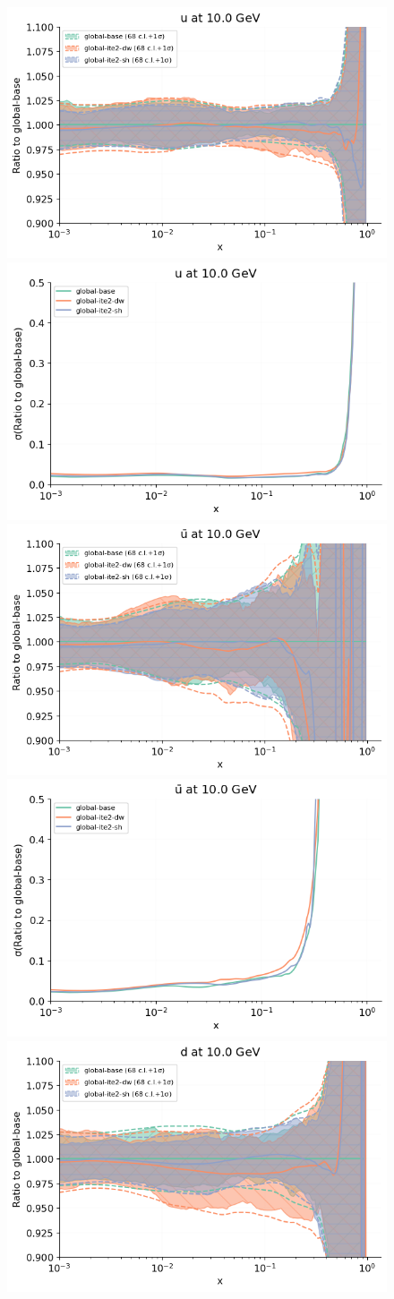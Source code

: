 \documentclass[11pt,a4paper]{article}
\begin{document}
\begin{figure}[!t]
\centering
\includegraphics[width=0.49\linewidth]{plots/proton_pdf_u.png}
\includegraphics[width=0.49\linewidth]{plots/uncertainty_u.png}\\
\includegraphics[width=0.49\linewidth]{plots/proton_pdf_ubar.png}
\includegraphics[width=0.49\linewidth]{plots/uncertainty_ubar.png}\\
\includegraphics[width=0.49\linewidth]{plots/proton_pdf_d.png}

\end{figure}
\end{document}
